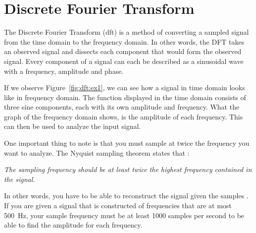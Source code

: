 \section{Discrete Fourier Transform}
The Discrete Fourier Transform (\gls{dft}) is a method of converting a sampled signal from the time domain to the frequency domain. In other words, the DFT takes an observed signal and dissects each component that would form the observed signal. Every component of a signal can each be described as a sinusoidal wave with a frequency, amplitude and phase.

If we observe Figure~\ref{fig:dft:ex1}, we can see how a signal in time domain looks like in frequency domain. The function displayed in the time domain consists of three sine components, each with its own amplitude and frequency. What the graph of the frequency domain shows, is the amplitude of each frequency. This can then be used to analyze the input signal.

One important thing to note is that you must sample at twice the frequency you want to analyze. The Nyquist sampling theorem states that \cite{signal:aliasing}:
\begin{center}
    \textit{The sampling frequency should be at least twice the highest frequency contained in the signal.}
\end{center}
In other words, you have to be able to reconstruct the signal given the samples \cite[Ch~3]{smith1997scientist}. If you are given a signal that is constructed of frequencies that are at most 500~Hz, your sample frequency must be at least 1000 samples per second to be able to find the amplitude for each frequency.

